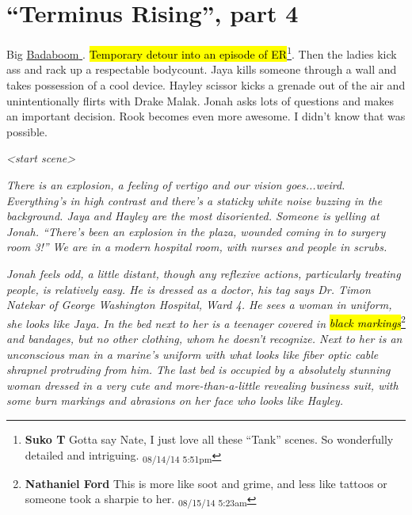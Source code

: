 \setcounter{chapter}{ 29 }
\chapter{\textbf{``Terminus Rising'', part 4} }






Big \underline{  {\color[RGB]{17,85,204}Badaboom}  }.  \hl{Temporary detour into an episode of ER}\footnote{\textbf{Suko T }Gotta say Nate, I just love all these ``Tank'' scenes.  So wonderfully detailed and intriguing. \textsubscript{08/14/14 5:51pm}}.  Then the ladies kick ass and rack up a respectable bodycount.   Jaya kills someone through a wall and takes possession of a cool device.  Hayley scissor kicks a grenade out of the air and unintentionally flirts with Drake Malak.  Jonah asks lots of questions and makes an important decision.  Rook becomes even more awesome.  I didn't know that was possible.



\noindent\hrulefill





\textit{\textless start scene\textgreater }



\textit{There is an explosion, a feeling of vertigo and our vision goes...weird.  Everything's in high contrast and there's a staticky white noise buzzing in the background.  Jaya and Hayley are the most disoriented.  Someone is yelling at Jonah.  ``There's been an explosion in the plaza, wounded coming in to surgery room 3!''  We are in a modern hospital room, with nurses and people in scrubs.}



\textit{Jonah feels odd, a little distant, though any reflexive actions, particularly treating people, is relatively easy.  He is dressed as a doctor, his tag says Dr. Timon Natekar of George Washington Hospital, Ward 4.  He sees a woman in uniform, she looks like Jaya.  In the bed next to her is a teenager covered in }\textit{\hl{black markings}}\footnote{\textbf{Nathaniel Ford }This is more like soot and grime, and less like tattoos or someone took a sharpie to her. \textsubscript{08/15/14 5:23am}}\textit{ and bandages, but no other clothing, whom he doesn't recognize.  Next to her is an unconscious man in a marine's uniform with what looks like fiber optic cable shrapnel protruding from him.  The last bed is occupied by a absolutely stunning woman dressed in a very cute and more-than-a-little revealing business suit, with some burn markings and abrasions on her face who looks like Hayley.}



